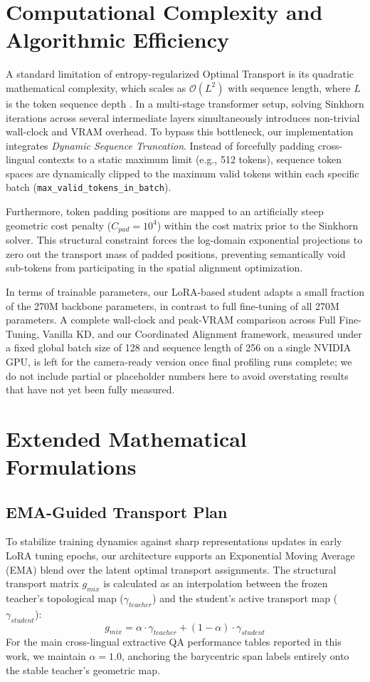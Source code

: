 \documentclass[11pt]{article}
\begin{document}
\section{Computational Complexity and Algorithmic Efficiency}
\label{sec:appendix_complexity}
A standard limitation of entropy-regularized Optimal Transport is its quadratic mathematical complexity, which scales as $\mathcal{O}(L^2)$ with sequence length, where $L$ is the token sequence depth \cite{cuturi2013sinkhorndistanceslightspeedcomputation}. In a multi-stage transformer setup, solving Sinkhorn iterations across several intermediate layers simultaneously introduces non-trivial wall-clock and VRAM overhead. To bypass this bottleneck, our implementation integrates \textit{Dynamic Sequence Truncation}. Instead of forcefully padding cross-lingual contexts to a static maximum limit (e.g., 512 tokens), sequence token spaces are dynamically clipped to the maximum valid tokens within each specific batch (\texttt{max\_valid\_tokens\_in\_batch}).

Furthermore, token padding positions are mapped to an artificially steep geometric cost penalty ($C_{pad} = 10^4$) within the cost matrix prior to the Sinkhorn solver. This structural constraint forces the log-domain exponential projections to zero out the transport mass of padded positions, preventing semantically void sub-tokens from participating in the spatial alignment optimization. 

In terms of trainable parameters, our LoRA-based student adapts a small fraction of the 270M backbone parameters, in contrast to full fine-tuning of all 270M parameters. A complete wall-clock and peak-VRAM comparison across Full Fine-Tuning, Vanilla KD, and our Coordinated Alignment framework, measured under a fixed global batch size of 128 and sequence length of 256 on a single NVIDIA GPU, is left for the camera-ready version once final profiling runs complete; we do not include partial or placeholder numbers here to avoid overstating results that have not yet been fully measured.

\section{Extended Mathematical Formulations}
\label{sec:appendix_math}

\subsection{EMA-Guided Transport Plan}
To stabilize training dynamics against sharp representations updates in early LoRA tuning epochs, our architecture supports an Exponential Moving Average (EMA) blend over the latent optimal transport assignments. The structural transport matrix $g_{mix}$ is calculated as an interpolation between the frozen teacher's topological map ($\gamma_{teacher}$) and the student's active transport map ($\gamma_{student}$):
$$ g_{mix} = \alpha \cdot \gamma_{teacher} + (1 - \alpha) \cdot \gamma_{student} $$
For the main cross-lingual extractive QA performance tables reported in this work, we maintain $\alpha = 1.0$, anchoring the barycentric span labels entirely onto the stable teacher's geometric map.
\end{document}
